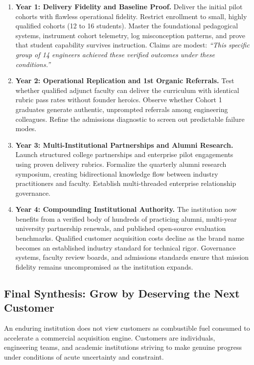 \begin{enumerate}[leftmargin=*]
\item \textbf{Year 1: Delivery Fidelity and Baseline Proof.} Deliver the initial pilot cohorts with flawless operational fidelity. Restrict enrollment to small, highly qualified cohorts (12 to 16 students). Master the foundational pedagogical systems, instrument cohort telemetry, log misconception patterns, and prove that student capability survives instruction. Claims are modest: \textit{``This specific group of 14 engineers achieved these verified outcomes under these conditions.''}
\item \textbf{Year 2: Operational Replication and 1st Organic Referrals.} Test whether qualified adjunct faculty can deliver the curriculum with identical rubric pass rates without founder heroics. Observe whether Cohort 1 graduates generate authentic, unprompted referrals among engineering colleagues. Refine the admissions diagnostic to screen out predictable failure modes.
\item \textbf{Year 3: Multi-Institutional Partnerships and Alumni Research.} Launch structured college partnerships and enterprise pilot engagements using proven delivery rubrics. Formalize the quarterly alumni research symposium, creating bidirectional knowledge flow between industry practitioners and faculty. Establish multi-threaded enterprise relationship governance.
\item \textbf{Year 4: Compounding Institutional Authority.} The institution now benefits from a verified body of hundreds of practicing alumni, multi-year university partnership renewals, and published open-source evaluation benchmarks. Qualified customer acquisition costs decline as the brand name becomes an established industry standard for technical rigor. Governance systems, faculty review boards, and admissions standards ensure that mission fidelity remains uncompromised as the institution expands.
\end{enumerate}

\subsection*{Final Synthesis: Grow by Deserving the Next Customer}

An enduring institution does not view customers as combustible fuel consumed to accelerate a commercial acquisition engine. Customers are individuals, engineering teams, and academic institutions striving to make genuine progress under conditions of acute uncertainty and constraint.

